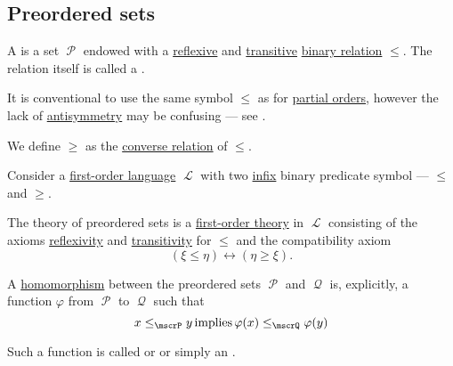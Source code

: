 \subsection{Preordered sets}\label{subsec:preordered_sets}

\begin{definition}\label{def:preordered_set}
  A  is a set \( \mscrP \) endowed with a \hyperref[def:binary_relation/reflexive]{reflexive} and \hyperref[def:binary_relation/transitive]{transitive} \hyperref[def:binary_relation]{binary relation} \( \leq \). The relation itself is called a .

  It is conventional to use the same symbol \( \leq \) as for \hyperref[def:poset]{partial orders}, however the lack of \hyperref[def:binary_relation/antisymmetric]{antisymmetry} may be confusing --- see .

  We define \( \geq \) as the \hyperref[def:binary_relation/converse]{converse relation} of \( \leq \).

  \begin{thmenum}[series=def:preordered_set]
     Consider a \hyperref[def:first_order_language]{first-order language} \( \mscrL \) with two \hyperref[rem:first_order_formula_conventions/infix]{infix} binary predicate symbol --- \( \leq \) and \( \geq \).

    The theory of preordered sets is a \hyperref[def:first_order_theory]{first-order theory} in \( \mscrL \) consisting of the axioms \hyperref[def:binary_relation/reflexive]{reflexivity} and \hyperref[def:binary_relation/transitive]{transitivity} for \( \leq \) and the compatibility axiom
    \begin{equation}\label{eq:def:preordered_set/theory}
      (\xi \leq \eta) \leftrightarrow (\eta \geq \xi).
    \end{equation}

     A \hyperref[def:first_order_homomorphism]{homomorphism} between the preordered sets \( \mscrP \) and \( \mscrQ \) is, explicitly, a function \( \varphi \) from \( \mscrP \) to \( \mscrQ \) such that
    \begin{equation}\label{eq:def:preordered_set/homomorphism}
      x \leq_\mscrP y \T{implies} \varphi(x) \leq_\mscrQ \varphi(y)
    \end{equation}

    Such a function is called  or  or simply an .


\end{thmenum}
\end{definition}
